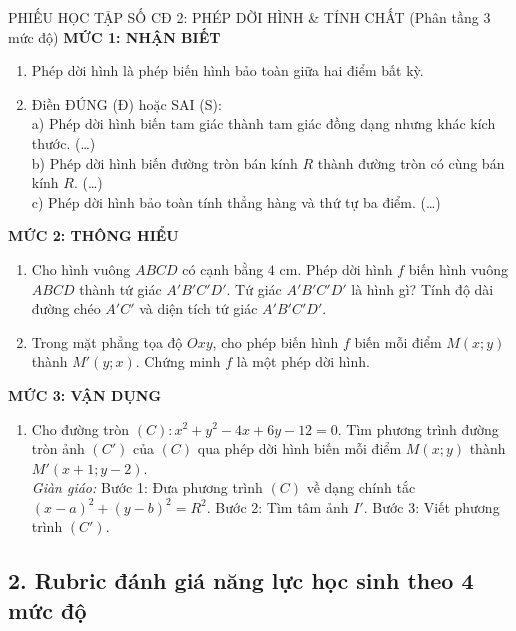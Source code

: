 \documentclass[12pt, a4paper]{article}
\begin{document}
\begin{pedabox}{PHIẾU HỌC TẬP SỐ CĐ 2: PHÉP DỜI HÌNH \& TÍNH CHẤT (Phân tầng 3 mức độ)}
\textbf{MỨC 1: NHẬN BIẾT}
\begin{enumerate}[leftmargin=0.5cm]
    \item Phép dời hình là phép biến hình bảo toàn \dotfill giữa hai điểm bất kỳ.
    \item Điền ĐÚNG (Đ) hoặc SAI (S):\\
    a) Phép dời hình biến tam giác thành tam giác đồng dạng nhưng khác kích thước. (\dots)\\
    b) Phép dời hình biến đường tròn bán kính $R$ thành đường tròn có cùng bán kính $R$. (\dots)\\
    c) Phép dời hình bảo toàn tính thẳng hàng và thứ tự ba điểm. (\dots)
\end{enumerate}

\textbf{MỨC 2: THÔNG HIỂU}
\begin{enumerate}[leftmargin=0.5cm]
    \item Cho hình vuông $ABCD$ có cạnh bằng $4\text{ cm}$. Phép dời hình $f$ biến hình vuông $ABCD$ thành tứ giác $A'B'C'D'$. Tứ giác $A'B'C'D'$ là hình gì? Tính độ dài đường chéo $A'C'$ và diện tích tứ giác $A'B'C'D'$.
    \item Trong mặt phẳng tọa độ $Oxy$, cho phép biến hình $f$ biến mỗi điểm $M(x; y)$ thành $M'(y; x)$. Chứng minh $f$ là một phép dời hình.
\end{enumerate}

\textbf{MỨC 3: VẬN DỤNG}
\begin{enumerate}[leftmargin=0.5cm]
    \item Cho đường tròn $(C): x^2 + y^2 - 4x + 6y - 12 = 0$. Tìm phương trình đường tròn ảnh $(C')$ của $(C)$ qua phép dời hình biến mỗi điểm $M(x; y)$ thành $M'(x + 1; y - 2)$.\\
    \textit{Giàn giáo:} Bước 1: Đưa phương trình $(C)$ về dạng chính tắc $(x - a)^2 + (y - b)^2 = R^2$. Bước 2: Tìm tâm ảnh $I'$. Bước 3: Viết phương trình $(C')$.
\end{enumerate}
\end{pedabox}

\subsection*{2. Rubric đánh giá năng lực học sinh theo 4 mức độ}
\end{document}
